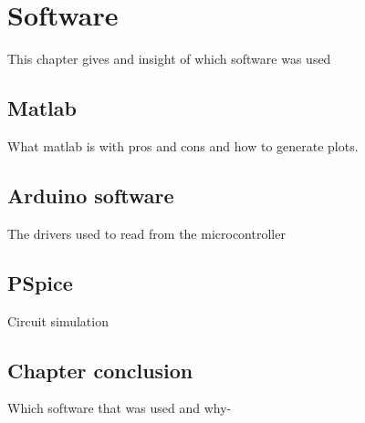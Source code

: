 \chapter{Software}
This chapter gives and insight of which software was used

\section{Matlab}
What matlab is with pros and cons and how to generate plots.

\section{Arduino software}
The drivers used to read from the microcontroller

\section{PSpice}
Circuit simulation

\section{Chapter conclusion}
Which software that was used and why-